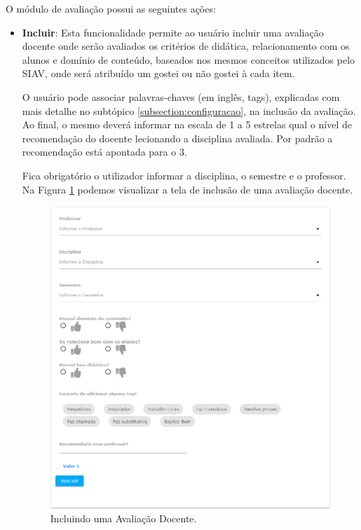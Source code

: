 \documentclass[12pt, a4paper]{report}
\begin{document}
O módulo de avaliação possui as seguintes ações:
\begin{itemize}
\item \textbf{Incluir}: Esta funcionalidade permite ao usuário incluir uma avaliação docente onde serão avaliados os critérios de didática, relacionamento com os alunos e domínio de conteúdo, baseados nos mesmos conceitos utilizados pelo SIAV, onde será atribuído um gostei ou não gostei à cada item.

O usuário pode associar palavras-chaves (em inglês, tags), explicadas com mais detalhe no subtópico \ref{subsection:configuracao}, na inclusão da avaliação. Ao final, o mesmo deverá informar na escala de 1 a 5 estrelas qual o nível de recomendação do docente lecionando a disciplina avaliada. Por padrão a recomendação está apontada para o 3. 

Fica obrigatório o utilizador informar a disciplina, o semestre e o professor. Na Figura \ref{fig:incluir_avaliacao}  podemos visualizar a tela de inclusão de uma avaliação docente.

\begin{figure}
\centering
\includegraphics[scale=0.5]{incluir_avaliacao.png}
\caption{Incluindo uma Avaliação Docente.}
\label{fig:incluir_avaliacao}
\end{figure}


\end{itemize}
\end{document}
